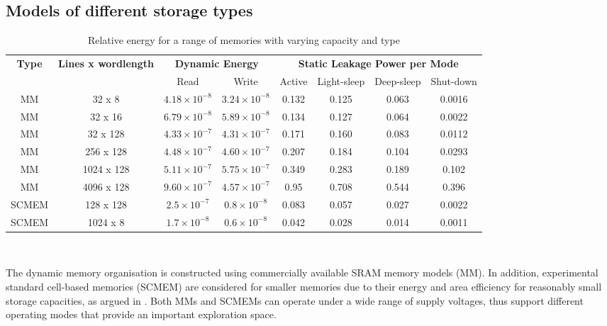 \documentclass[a4paper,conference]{IEEEtran}
\begin{document}
\subsection{Models of different storage types}

\begin{center}
	\begin{table}[!t]
	\caption{Relative energy for a range of memories with varying capacity and type}
	\label{tab:relative}
	{\small
	\hfill{}
	\begin{tabular}{|c|c|c|c|c|c|c|c|}
		\hline
		\multirow{2}{*}{\textbf{Type}} & \multirow{2}{*}{\textbf{Lines x wordlength}} & \multicolumn{2}{c|}{\textbf{Dynamic Energy}}& \multicolumn{4}{c|}{\textbf{Static Leakage Power per Mode}}\\ \cline{3-8}
		& & Read & Write & Active & Light-sleep & Deep-sleep & Shut-down \\ 
		\hline 
		MM & 32 x 8 &  $ 4.18 \times 10^{-8} $ &  $ 3.24 \times 10^{-8} $ & 0.132 & 0.125 & 0.063 & 0.0016\\ 
		\hline
		MM & 32 x 16 & $  6.79 \times 10^{-8} $ &  $ 5.89 \times 10^{-8} $ & 0.134 & 0.127 & 0.064 & 0.0022\\ 
		\hline
		MM & 32 x 128 & $  4.33 \times 10^{-7} $ &  $ 4.31 \times 10^{-7} $ & 0.171 & 0.160 & 0.083 & 0.0112\\ 
		\hline
		MM & 256 x 128 & $  4.48 \times 10^{-7} $ &  $ 4.60 \times 10^{-7} $ & 0.207 & 0.184 & 0.104 & 0.0293\\ 
		\hline
		MM & 1024 x 128 & $  5.11 \times 10^{-7} $ &  $ 5.75 \times 10^{-7} $ & 0.349 & 0.283 & 0.189 & 0.102\\ 
		\hline
		MM & 4096 x 128 & $  9.60 \times 10^{-7} $ &  $ 4.57 \times 10^{-7} $ & 0.95 & 0.708 & 0.544 & 0.396\\ 
		\hline
		SCMEM & 128 x 128 & $  2.5 \times 10^{-7} $ &  $ 0.8 \times 10^{-8} $ & 0.083 & 0.057 & 0.027 & 0.0022\\ 
		\hline
		SCMEM & 1024 x 8 & $  1.7 \times 10^{-8} $ &  $ 0.6 \times 10^{-8} $ & 0.042 & 0.028 & 0.014 & 0.0011\\ 
		\hline
	\end{tabular}}
	\hfill{}
	\\
	\end{table}
\end{center}

The dynamic memory organisation is constructed using commercially available SRAM memory models (MM). In addition, experimental standard cell-based memories (SCMEM) \cite{Mei11}  are  considered for smaller memories due to their energy and area efficiency for reasonably small storage capacities, as argued in \cite{Mei10}. Both MMs and SCMEMs can operate under a wide range of supply voltages, thus support different operating modes that provide an important exploration space.
\end{document}
